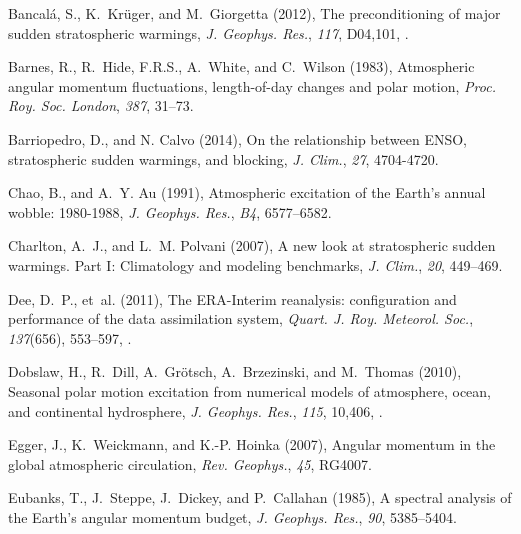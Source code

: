 \documentclass[draft,jgrga]{agutex}
\begin{document}
\begin{article}
\begin{thebibliography}{38}
Bancal{\'a}, S., K.~Kr{\"u}ger, and M.~Giorgetta (2012), The preconditioning of
  major sudden stratospheric warmings, \textit{J. Geophys. Res.}, \textit{117},
  D04,101, .

Barnes, R., R.~Hide, F.R.S., A.~White, and C.~Wilson (1983), Atmospheric
  angular momentum fluctuations, length-of-day changes and polar motion,
  \textit{Proc. Roy. Soc. London}, \textit{387}, 31--73.
  
Barriopedro, D., and N. Calvo (2014), On the relationship between {ENSO}, 
stratospheric sudden warmings, and blocking, \textit{J. Clim.},
  \textit{27}, 4704-4720.

Chao, B., and A.~Y. Au (1991), Atmospheric excitation of the {E}arth's annual
  wobble: 1980-1988, \textit{J. Geophys. Res.}, \textit{B4}, 6577--6582.

Charlton, A.~J., and L.~M. Polvani (2007), A new look at stratospheric sudden
  warmings. {Part I}: {Climatology} and modeling benchmarks, \textit{J. Clim.},
  \textit{20}, 449--469.

Dee, D.~P., et~al. (2011), {The ERA-Interim reanalysis: configuration and
  performance of the data assimilation system}, \textit{Quart. J. Roy.
  Meteorol. Soc.}, \textit{137}(656), 553--597, .

Dobslaw, H., R.~Dill, A.~Gr{\"o}tsch, A.~Brzezinski, and M.~Thomas (2010),
  Seasonal polar motion excitation from numerical models of atmosphere, ocean,
  and continental hydrosphere, \textit{J. Geophys. Res.}, \textit{115}, 10,406,
  .

Egger, J., K.~Weickmann, and K.-P. Hoinka (2007), Angular momentum in the
  global atmospheric circulation, \textit{Rev. Geophys.}, \textit{45}, RG4007.

Eubanks, T., J.~Steppe, J.~Dickey, and P.~Callahan (1985), A spectral analysis
  of the {E}arth's angular momentum budget, \textit{J. Geophys. Res.},
  \textit{90}, 5385--5404.


\end{thebibliography}
\end{article}
\end{document}
